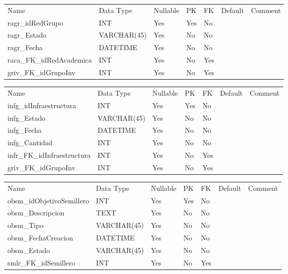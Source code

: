			\begin{center}
				\begin{tabular}{ |l|l|l|l|l|l|l| }
					\hline
					Name & Data Type & Nullable & PK & FK & Default & Comment \\
					ragr_idRedGrupo & INT & Yes & Yes & No &  & \\ \hline 
ragr_Estado & VARCHAR(45) & Yes & No & No &  & \\ \hline 
ragr_Fecha & DATETIME & Yes & No & No &  & \\ \hline 
raca_FK_idRedAcademica & INT & Yes & No & Yes &  & \\ \hline 
griv_FK_idGrupoInv & INT & Yes & No & Yes &  & \\ \hline 

				\end{tabular}
			\end{center}
		

			\begin{center}
				\begin{tabular}{ |l|l|l|l|l|l|l| }
					\hline
					Name & Data Type & Nullable & PK & FK & Default & Comment \\
					infg_idInfraestructura & INT & Yes & Yes & No &  & \\ \hline 
infg_Estado & VARCHAR(45) & Yes & No & No &  & \\ \hline 
infg_Fecha & DATETIME & Yes & No & No &  & \\ \hline 
infg_Cantidad & INT & Yes & No & No &  & \\ \hline 
infr_FK_idInfraestructura & INT & Yes & No & Yes &  & \\ \hline 
griv_FK_idGrupoInv & INT & Yes & No & Yes &  & \\ \hline 

				\end{tabular}
			\end{center}
		

			\begin{center}
				\begin{tabular}{ |l|l|l|l|l|l|l| }
					\hline
					Name & Data Type & Nullable & PK & FK & Default & Comment \\
					obsm_idObjetivoSemillero & INT & Yes & Yes & No &  & \\ \hline 
obsm_Descripcion & TEXT & Yes & No & No &  & \\ \hline 
obsm_Tipo & VARCHAR(45) & Yes & No & No &  & \\ \hline 
obsm_FechaCreacion & DATETIME & Yes & No & No &  & \\ \hline 
obsm_Estado & VARCHAR(45) & Yes & No & No &  & \\ \hline 
smlr_FK_idSemillero & INT & Yes & No & Yes &  & \\ \hline 

				\end{tabular}
			\end{center}
		

